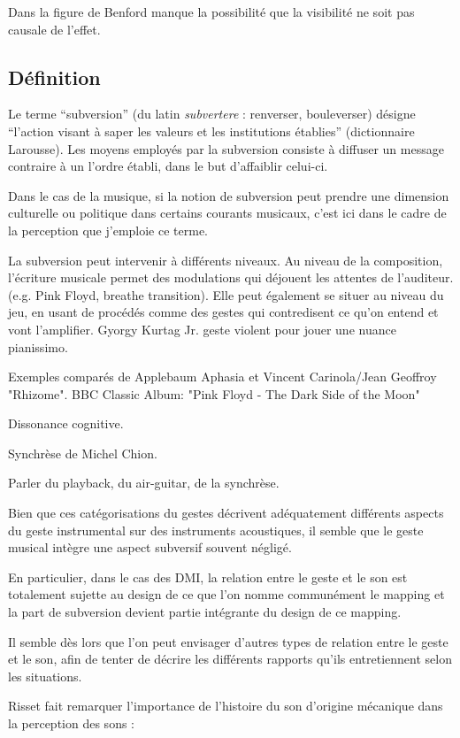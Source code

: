 Dans la figure de Benford manque la possibilité que la visibilité ne soit pas causale de l'effet.

\subsection{Définition} 

Le terme ``subversion'' (du latin \textit{subvertere} : renverser, bouleverser) désigne ``l'action visant à saper les valeurs et les institutions établies'' (dictionnaire Larousse). Les moyens employés par la subversion consiste à diffuser un message contraire à un l'ordre établi, dans le but d'affaiblir celui-ci.

Dans le cas de la musique, si la notion de subversion peut prendre une dimension culturelle ou politique dans certains courants musicaux, c'est ici dans le cadre de la perception que j'emploie ce terme.

La subversion peut intervenir à différents niveaux. Au niveau de la composition, l'écriture musicale permet des modulations qui déjouent les attentes de l'auditeur. (e.g. Pink Floyd, breathe transition). Elle peut également se situer au niveau du jeu, en usant de procédés comme des gestes qui contredisent ce qu'on entend et vont l'amplifier. Gyorgy Kurtag Jr. geste violent pour jouer une nuance pianissimo.

Exemples comparés de Applebaum Aphasia et Vincent Carinola/Jean Geoffroy "Rhizome".
BBC Classic Album: "Pink Floyd - The Dark Side of the Moon"

Dissonance cognitive.

Synchrèse de Michel Chion.

Parler du playback, du air-guitar, de la synchrèse.

Bien que ces catégorisations du gestes décrivent adéquatement différents aspects du geste instrumental sur des instruments acoustiques, il semble que le geste musical intègre une aspect subversif souvent négligé.

En particulier, dans le cas des \gls{DMI}, la relation entre le geste et le son est totalement sujette au design de ce que l'on nomme communément le \gls{mapping} et la part de subversion devient partie intégrante du design de ce mapping. 


Il semble dès lors que l'on peut envisager d'autres types de relation entre le geste et le son, afin de tenter de décrire les différents rapports qu'ils entretiennent selon les situations.

Risset fait remarquer l'importance de l'histoire du son d'origine mécanique dans la perception des sons \cite{risset_son_1992}: 

